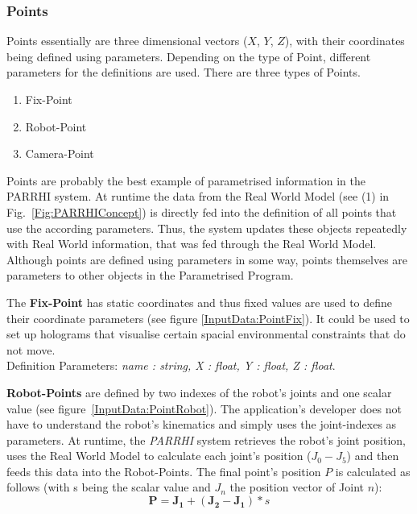\subsubsection{Points}\label{Section:Points}
 
Points essentially are three dimensional vectors ($X$, $Y$, $Z$), with their coordinates being defined using parameters. Depending on the type of Point, different parameters for the definitions are used. There are three types of Points.
\begin{enumerate}
	\setlength\itemsep{-1em}
	\item Fix-Point
	\item Robot-Point
	\item Camera-Point
\end{enumerate}

Points are probably the best example of parametrised information in the PARRHI system. At runtime the data from the Real World Model (see (1) in Fig.~\ref{Fig:PARRHIConcept}) is directly fed into the definition of all points that use the according parameters. Thus, the system updates these objects repeatedly with Real World information, that was fed through the Real World Model. Although points are defined using parameters in some way, points themselves are parameters to other objects in the Parametrised Program.

The \textbf{Fix-Point} has static coordinates and thus fixed values are used to define their coordinate parameters (see figure \ref{InputData:PointFix}). It could be used to set up holograms that visualise certain spacial environmental constraints that do not move.\\Definition Parameters: \textit{name : string, X : float, Y : float, Z : float}.

\textbf{Robot-Points} are defined by two indexes of the robot's joints and one scalar value (see figure~\ref{InputData:PointRobot}). The application's developer does not have to understand the robot's kinematics and simply uses the joint-indexes as parameters. At runtime, the \textit{PARRHI} system retrieves the robot's joint position, uses the Real World Model to calculate each joint's position ($J_0 - J_5$) and then feeds this data into the Robot-Points. The final point's position $P$ is calculated as follows (with s being the scalar value and $J_n$ the position vector of Joint $n$):
\begin{equation}
\boldsymbol{P} = \boldsymbol{J_1} + (\boldsymbol{J_2}-\boldsymbol{J_1}) * s
\end{equation}

